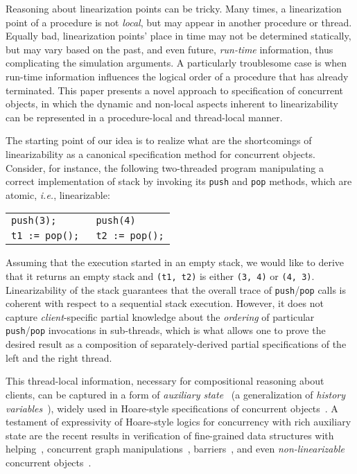 \documentclass[a4paper,UKenglish]{lipics-v2016}
\newcommand{\ie}{\emph{i.e.}\xspace}
\theoremstyle{definition}
\begin{document}
Reasoning about linearization points can be tricky. Many times, a
linearization point of a procedure is not \emph{local}, but may appear
in another procedure or thread. Equally bad, linearization points'
place in time may not be determined statically, but may vary based on
the past, and even future, \emph{run-time} information, thus
complicating the simulation arguments. A particularly troublesome case
is when run-time information influences the logical order of a
procedure that has already terminated.
%
This paper presents a novel approach to specification of concurrent
objects, in which the dynamic and non-local aspects inherent to
linearizability can be represented in a procedure-local and
thread-local manner. 


The starting point of our idea is to realize what are the
shortcomings of linearizability as a canonical specification method
for concurrent objects.
%
Consider, for instance, the following two-threaded program manipulating
a correct implementation of stack by invoking its \texttt{push}
and \texttt{pop} methods, which are atomic, \ie, linearizable:
%
\begin{center}
\begin{tabular}{l || l}
\texttt{push(3);} & \texttt{push(4)}
\\
\texttt{t1 := pop(); } & \texttt{t2 := pop();}
\end{tabular} 
\end{center}
%
Assuming that the execution started in an empty stack, we would like
to derive that it returns an empty stack and \texttt{(t1, t2)} is
either \texttt{(3, 4)} or \texttt{(4, 3)}.
%
Linearizability of the stack guarantees that the overall trace of
\texttt{push}/\texttt{pop} calls is coherent with respect to a
sequential stack execution. However, it does not capture
\emph{client}-specific partial knowledge about the \emph{ordering} of
particular \texttt{push}/\texttt{pop} invocations in sub-threads,
which is what allows one to prove the desired result as a composition
of separately-derived partial specifications of the left and the right
thread.

This thread-local information, necessary for compositional reasoning
about clients, can be captured in a form of \emph{auxiliary
  state}~\cite{OwickiG+CACM76} (a generalization of \emph{history
  variables}~\cite{AbadiL+lics88}), widely used in Hoare-style
specifications of concurrent
objects~\cite{SergeyNB+ESOP15,LeyWildN+POPL13,JungSSSTBD+POPL15,JungKBD+ICFP16}. A
testament of expressivity of Hoare-style logics for concurrency with
rich auxiliary state are the recent results in verification of
fine-grained data structures with helping~\cite{SergeyNB+ESOP15},
concurrent graph manipulations~\cite{SergeyNB+PLDI15},
barriers~\cite{JungKBD+ICFP16,DoddsJPSB+TOPLAS16}, and even
\emph{non-linearizable} concurrent objects~\cite{SergeyNBD+OOPSLA16}.
\end{document}
